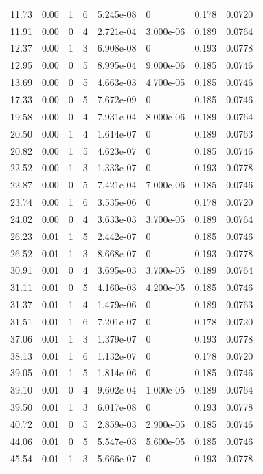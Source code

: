 \documentclass[preview]{standalone}
\begin{document}
{{\begin{tabular}{L{1.2cm}C{1.2cm} C{0.3cm}C{0.5cm} C{1.4cm}C{1.4cm} C{1.4cm}C{1.4cm}}
  11.73  &  0.00  & 1     &  6 &  5.245e-08  & 0  & 0.178 &  0.0720   \\ 
  11.91  &  0.00  & 0     &  4 &  2.721e-04  & 3.000e-06  & 0.189 &  0.0764   \\ 
  12.37  &  0.00  & 1     &  3 &  6.908e-08  & 0  & 0.193 &  0.0778   \\ 
  12.95  &  0.00  & 0     &  5 &  8.995e-04  & 9.000e-06  & 0.185 &  0.0746   \\ 
  13.69  &  0.00  & 0     &  5 &  4.663e-03  & 4.700e-05  & 0.185 &  0.0746   \\ 
  17.33  &  0.00  & 0     &  5 &  7.672e-09  & 0  & 0.185 &  0.0746   \\ 
  19.58  &  0.00  & 0     &  4 &  7.931e-04  & 8.000e-06  & 0.189 &  0.0764   \\ 
  20.50  &  0.00  & 1     &  4 &  1.614e-07  & 0  & 0.189 &  0.0763   \\ 
  20.82  &  0.00  & 1     &  5 &  4.623e-07  & 0  & 0.185 &  0.0746   \\ 
  22.52  &  0.00  & 1     &  3 &  1.333e-07  & 0  & 0.193 &  0.0778   \\ 
  22.87  &  0.00  & 0     &  5 &  7.421e-04  & 7.000e-06  & 0.185 &  0.0746   \\ 
  23.74  &  0.00  & 1     &  6 &  3.535e-06  & 0  & 0.178 &  0.0720   \\ 
  24.02  &  0.00  & 0     &  4 &  3.633e-03  & 3.700e-05  & 0.189 &  0.0764   \\ 
  26.23  &  0.01  & 1     &  5 &  2.442e-07  & 0  & 0.185 &  0.0746   \\ 
  26.52  &  0.01  & 1     &  3 &  8.668e-07  & 0  & 0.193 &  0.0778   \\ 
  30.91  &  0.01  & 0     &  4 &  3.695e-03  & 3.700e-05  & 0.189 &  0.0764   \\ 
  31.11  &  0.01  & 0     &  5 &  4.160e-03  & 4.200e-05  & 0.185 &  0.0746   \\ 
  31.37  &  0.01  & 1     &  4 &  1.479e-06  & 0  & 0.189 &  0.0763   \\ 
  31.51  &  0.01  & 1     &  6 &  7.201e-07  & 0  & 0.178 &  0.0720   \\ 
  37.06  &  0.01  & 1     &  3 &  1.379e-07  & 0  & 0.193 &  0.0778   \\ 
  38.13  &  0.01  & 1     &  6 &  1.132e-07  & 0  & 0.178 &  0.0720   \\ 
  39.05  &  0.01  & 1     &  5 &  1.814e-06  & 0  & 0.185 &  0.0746   \\ 
  39.10  &  0.01  & 0     &  4 &  9.602e-04  & 1.000e-05  & 0.189 &  0.0764   \\ 
  39.50  &  0.01  & 1     &  3 &  6.017e-08  & 0  & 0.193 &  0.0778   \\ 
  40.72  &  0.01  & 0     &  5 &  2.859e-03  & 2.900e-05  & 0.185 &  0.0746   \\ 
  44.06  &  0.01  & 0     &  5 &  5.547e-03  & 5.600e-05  & 0.185 &  0.0746   \\ 
  45.54  &  0.01  & 1     &  3 &  5.666e-07  & 0  & 0.193 &  0.0778   \\ 
\hline 
\end{tabular} 

}}
\end{document}
